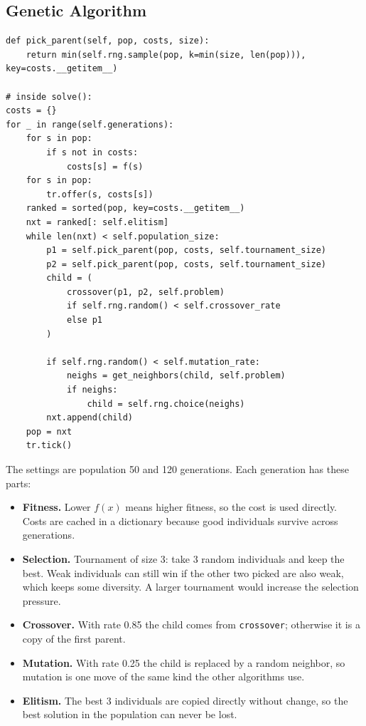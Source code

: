 \documentclass[11pt,a4paper]{article}
\newcommand{\col}[1]{\texttt{#1}}
\begin{document}
\subsection{Genetic Algorithm}

\begin{lstlisting}
def pick_parent(self, pop, costs, size):
    return min(self.rng.sample(pop, k=min(size, len(pop))), key=costs.__getitem__)

# inside solve():
costs = {}
for _ in range(self.generations):
    for s in pop:
        if s not in costs:
            costs[s] = f(s)
    for s in pop:
        tr.offer(s, costs[s])
    ranked = sorted(pop, key=costs.__getitem__)
    nxt = ranked[: self.elitism]
    while len(nxt) < self.population_size:
        p1 = self.pick_parent(pop, costs, self.tournament_size)
        p2 = self.pick_parent(pop, costs, self.tournament_size)
        child = (
            crossover(p1, p2, self.problem)
            if self.rng.random() < self.crossover_rate
            else p1
        )

        if self.rng.random() < self.mutation_rate:
            neighs = get_neighbors(child, self.problem)
            if neighs:
                child = self.rng.choice(neighs)
        nxt.append(child)
    pop = nxt
    tr.tick()
\end{lstlisting}

\noindent The settings are population 50 and 120 generations. Each generation has these parts:
\begin{itemize}
  \item \textbf{Fitness.} Lower $f(x)$ means higher fitness, so the cost is used directly. Costs are
  cached in a dictionary because good individuals survive across generations.
  \item \textbf{Selection.} Tournament of size 3: take 3 random individuals and keep the best. Weak
  individuals can still win if the other two picked are also weak, which keeps some diversity. A
  larger tournament would increase the selection pressure.
  \item \textbf{Crossover.} With rate 0.85 the child comes from \col{crossover}; otherwise it is a copy
  of the first parent.
  \item \textbf{Mutation.} With rate 0.25 the child is replaced by a random neighbor, so mutation is
  one move of the same kind the other algorithms use.
  \item \textbf{Elitism.} The best 3 individuals are copied directly without change, so the best
  solution in the population can never be lost.
\end{itemize}
\end{document}
